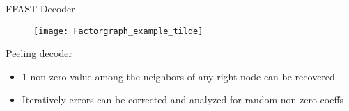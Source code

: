 	\begin{frame}{FFAST Decoder}
		
		
%			
%				
%			
			\vspace{-5pt}
			\begin{figure}[t]
				
				\texttt{[image: Factorgraph\_example\_tilde]}
			\end{figure}
		\begin{block}{Peeling decoder}
			\begin{itemize}
				\item 1 non-zero value among the neighbors of any right node can be recovered
				
				\item Iteratively errors can be corrected and analyzed for random non-zero coeffs
			\end{itemize}
		\end{block}
	\end{frame}	
